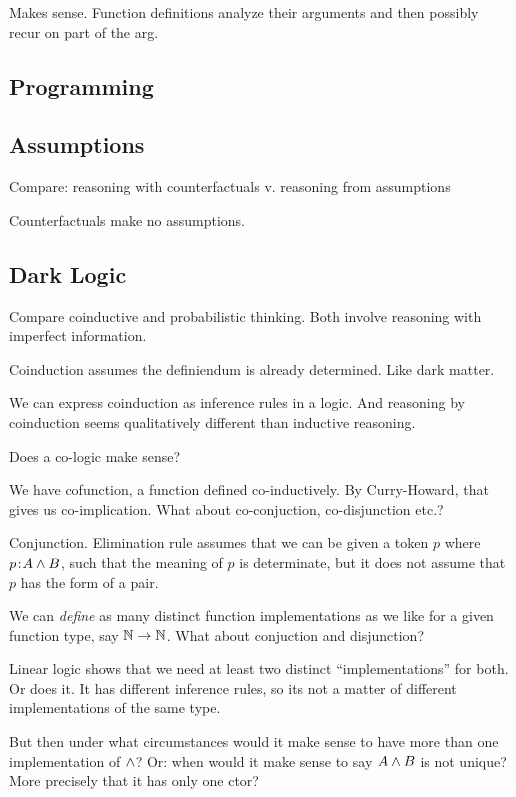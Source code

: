 \documentclass{article}
\begin{document}
Makes sense. Function definitions analyze their arguments and then
possibly recur on part of the arg.

\subsection{Programming}

 \cite{goguen1996algebraic}

\subsection{Assumptions}

Compare: reasoning with counterfactuals v. reasoning from assumptions

Counterfactuals make no assumptions.

\subsection{Dark Logic}

Compare coinductive and probabilistic thinking. Both involve reasoning
with imperfect information.

Coinduction assumes the definiendum is already determined. Like dark
matter.

We can express coinduction as inference rules in a logic. And
reasoning by coinduction seems qualitatively different than inductive
reasoning.

Does a co-logic make sense?

We have cofunction, a function defined co-inductively. By
Curry-Howard, that gives us co-implication. What about co-conjuction,
co-disjunction etc.?

Conjunction. Elimination rule assumes that we can be given a token
\(p\) where \(p\hspace{1pt}\mathpunct{:}\hspace{-1pt}A\land B\), such that the meaning of \(p\) is
determinate, but it does not assume that \(p\) has the form of a pair.

We can \textit{define} as many distinct function implementations as we
like for a given function type, say \(\mathbb{N}\rightarrow\mathbb{N}\). What about
conjuction and disjunction?

Linear logic shows that we need at least two distinct
``implementations'' for both. Or does it. It has different inference
rules, so its not a matter of different implementations of the same
type.

But then under what circumstances would it make sense to have more
than one implementation of \(\land\)? Or: when would it make sense to
say \(A \land B\) is not unique? More precisely that it has only one
ctor?
\end{document}
